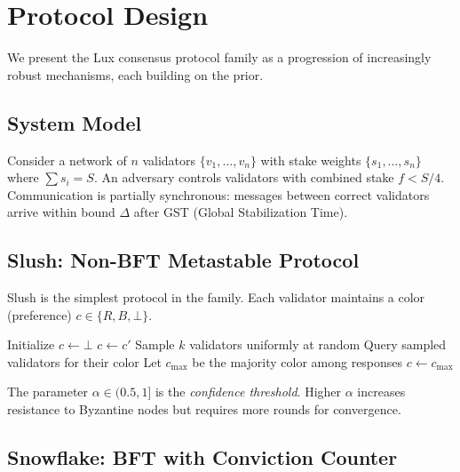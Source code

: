 \section{Protocol Design}
\label{sec:protocol}

We present the Lux consensus protocol family as a progression of increasingly robust mechanisms, each building on the prior.

\subsection{System Model}

Consider a network of $n$ validators $\{v_1, \ldots, v_n\}$ with stake weights $\{s_1, \ldots, s_n\}$ where $\sum s_i = S$. An adversary controls validators with combined stake $f < S/4$. Communication is partially synchronous: messages between correct validators arrive within bound $\Delta$ after GST (Global Stabilization Time).

\subsection{Slush: Non-BFT Metastable Protocol}

Slush is the simplest protocol in the family. Each validator maintains a color (preference) $c \in \{R, B, \bot\}$.

\begin{algorithm}[h]
\caption{Slush Protocol}
\begin{algorithmic}[1]
\State Initialize $c \gets \bot$
     $c \gets c'$ \EndIf
        \State Sample $k$ validators uniformly at random
        \State Query sampled validators for their color
        \State Let $c_{\max}$ be the majority color among responses
         $c \gets c_{\max}$ \EndIf
    \EndFor
\EndUpon
\end{algorithmic}
\end{algorithm}

The parameter $\alpha \in (0.5, 1]$ is the \emph{confidence threshold}. Higher $\alpha$ increases resistance to Byzantine nodes but requires more rounds for convergence.

\subsection{Snowflake: BFT with Conviction Counter}

